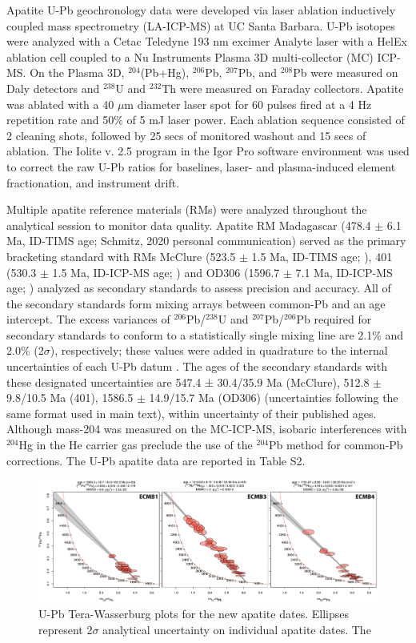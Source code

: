 \documentclass[11pt,letterpaper]{article}
\begin{document}
Apatite U-Pb geochronology data were developed via laser ablation inductively coupled mass spectrometry (LA-ICP-MS) at UC Santa Barbara. U-Pb isotopes were analyzed with a Cetac Teledyne 193 nm excimer Analyte laser with a HelEx ablation cell coupled to a Nu Instruments Plasma 3D multi-collector (MC) ICP-MS. On the Plasma 3D, $^{204}$(Pb+Hg), $^{206}$Pb, $^{207}$Pb, and $^{208}$Pb were measured on Daly detectors and $^{238}$U and $^{232}$Th were measured on Faraday collectors. Apatite was ablated with a 40 $\mu$m diameter laser spot for 60 pulses fired at a 4 Hz repetition rate and 50$\%$ of 5 mJ laser power. Each ablation sequence consisted of 2 cleaning shots, followed by 25 secs of monitored washout and 15 secs of ablation. The Iolite v. 2.5 program \citep{Paton2011a} in the Igor Pro software environment was used to correct the raw U-Pb ratios for baselines, laser- and plasma-induced element fractionation, and instrument drift.

Multiple apatite reference materials (RMs) were analyzed throughout the analytical session to monitor data quality. Apatite RM Madagascar (478.4 $\pm$ 6.1 Ma, ID-TIMS age; Schmitz, 2020 personal communication) served as the primary bracketing standard with RMs McClure (523.5 $\pm$ 1.5 Ma, ID-TIMS age; \citealp{Schoene2006b}), 401 (530.3 $\pm$ 1.5 Ma, ID-ICP-MS age; \citealp{Thompson2016a}) and OD306 (1596.7 $\pm$ 7.1 Ma, ID-ICP-MS age; \citealp{Thompson2016a}) analyzed as secondary standards to assess precision and accuracy. All of the secondary standards form mixing arrays between common-Pb and an age intercept. The excess variances of $^{206}$Pb/$^{238}$U and $^{207}$Pb/$^{206}$Pb required for secondary standards to conform to a statistically single mixing line are 2.1$\%$ and 2.0$\%$ (2$\sigma$), respectively; these values were added in quadrature to the internal uncertainties of each U-Pb datum \citep{Horstwood2016a}. The ages of the secondary standards with these designated uncertainties are 547.4 ± 30.4/35.9 Ma (McClure), 512.8 $\pm$ 9.8/10.5 Ma (401), 1586.5 $\pm$ 14.9/15.7 Ma (OD306) (uncertainties following the same format used in main text), within uncertainty of their published ages. Although mass-204 was measured on the MC-ICP-MS, isobaric interferences with $^{204}$Hg in the He carrier gas preclude the use of the $^{204}$Pb method for common-Pb corrections. The U-Pb apatite data are reported in Table S2.


\begin{figure}[!ht]
\noindent\includegraphics[width=\textwidth]{./figures/SI_apatite_TW.pdf}
\centering
\caption{\small{U-Pb Tera-Wasserburg plots for the new apatite dates. Ellipses represent 2$\sigma$ analytical uncertainty on individual apatite dates. The }}
\label{fig:apatite_TW}
\end{figure}
\end{document}
